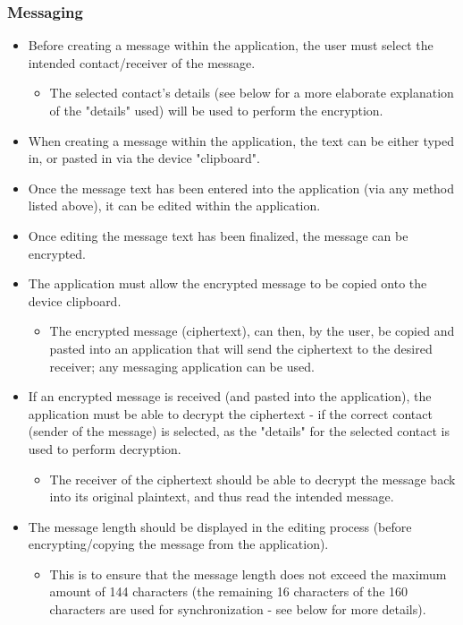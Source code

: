 \subsubsection{Messaging}
\begin{itemize}
\item Before creating a message within the application, the user must select the intended contact/receiver of the message.
\begin{itemize}
\item The selected contact's details (see below for a more elaborate explanation of the "details" used) will be used to perform the encryption.
\end{itemize}
\item When creating a message within the application, the text can be either typed in, or pasted in via the device "clipboard".
\item Once the message text has been entered into the application (via any method listed above), it can be edited within the application.
\item Once editing the message text has been finalized, the message can be encrypted.
\item The application must allow the encrypted message to be copied onto the device clipboard.
\begin{itemize}
\item The encrypted message (ciphertext), can then, by the user, be copied and pasted into an application that will send the ciphertext to the desired receiver; any messaging application can be used.
\end{itemize}
\item If an encrypted message is received (and pasted into the application), the application must be able to decrypt the ciphertext - if the correct contact (sender of the message) is selected, as the "details" for the selected contact is used to perform decryption.
\begin{itemize}
\item The receiver of the ciphertext should be able to decrypt the message back into its original plaintext, and thus read the intended message.
\end{itemize}
\item The message length should be displayed in the editing process (before encrypting/copying the message from the application).
\begin{itemize}
\item This is to ensure that the message length does not exceed the maximum amount of 144 characters (the remaining 16 characters of the 160 characters are used for synchronization - see below for more details).
\end{itemize}
\end{itemize}

